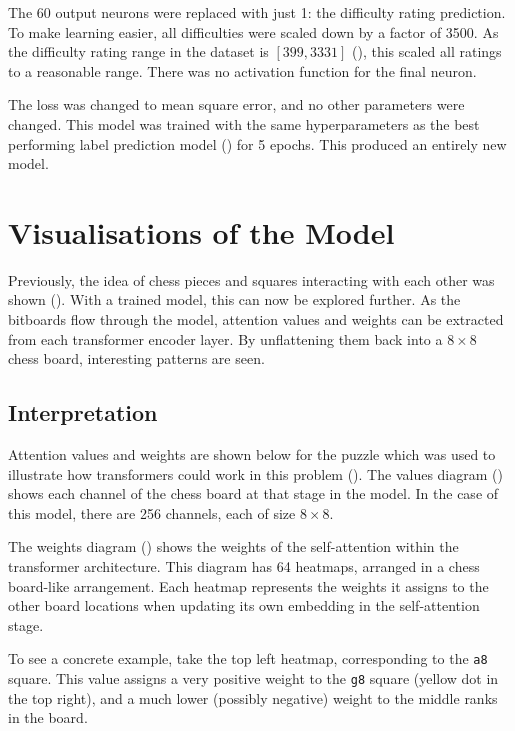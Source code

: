 The 60 output neurons were replaced with just 1: the difficulty rating
prediction. To make learning easier, all difficulties were scaled down by a
factor of 3500. As the difficulty rating range in the dataset is $[399, 3331]$
(), this scaled all ratings to a reasonable range. There
was no activation function for the final neuron.

The loss was changed to mean square error, and no other parameters were
changed. This model was trained with the same hyperparameters as the best
performing label prediction model () for 5 epochs. This produced an
entirely new model.

\section{Visualisations of the Model}\label{mlS3}

Previously, the idea of chess pieces and squares interacting with each other
was shown (). With a trained model, this can now be
explored further. As the bitboards flow through the model, attention values and
weights can be extracted from each transformer encoder layer. By unflattening
them back into a $8\times8$ chess board, interesting patterns are seen.

\subsection{Interpretation}

Attention values and weights are shown below for the puzzle which was used to
illustrate how transformers could work in this problem
(). The values diagram () shows each channel
of the chess board at that stage in the model. In the case of this model, there
are 256 channels, each of size $8\times8$. 

The weights diagram () shows the weights of the self-attention
within the transformer architecture. This diagram has 64 heatmaps, arranged in
a chess board-like arrangement. Each heatmap represents the weights it assigns
to the other board locations when updating its own embedding in the
self-attention stage.

To see a concrete example, take the top left heatmap, corresponding to the
\texttt{a8} square. This value assigns a very positive weight to the
\texttt{g8} square (yellow dot in the top right), and a much lower (possibly
negative) weight to the middle ranks in the board.


